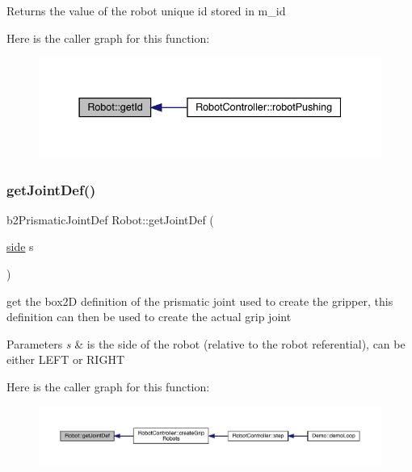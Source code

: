 \begin{DoxyReturn}{Returns}
the value of the robot unique id stored in m\+\_\+id 
\end{DoxyReturn}
Here is the caller graph for this function\+:\nopagebreak
\begin{figure}[H]
\begin{center}
\leavevmode
\includegraphics[width=337pt]{class_robot_a8d1d94c9cab78a96851785b1679cd457_icgraph}
\end{center}
\end{figure}
\mbox{\label{class_robot_a536c96ba5f6c7d8f04d86a50b1adcd72}} 
\subsubsection{\texorpdfstring{get\+Joint\+Def()}{getJointDef()}}
{\footnotesize\ttfamily b2\+Prismatic\+Joint\+Def Robot\+::get\+Joint\+Def (\begin{DoxyParamCaption}\item[{\mbox{\hyperlink{_robot_8h_afc015eff6557e84151d2e53b94375445}{side}}}]{s }\end{DoxyParamCaption})}

get the box2D definition of the prismatic joint used to create the gripper, this definition can then be used to create the actual grip joint 
\begin{DoxyParams}{Parameters}
{\em s} & is the side of the robot (relative to the robot referential), can be either L\+E\+FT or R\+I\+G\+HT \\
\hline
\end{DoxyParams}
Here is the caller graph for this function\+:\nopagebreak
\begin{figure}[H]
\begin{center}
\leavevmode
\includegraphics[width=350pt]{class_robot_a536c96ba5f6c7d8f04d86a50b1adcd72_icgraph}
\end{center}
\end{figure}
\mbox{\label{class_robot_aafe55f24c0b2ba70dc915362abd46485}} 
